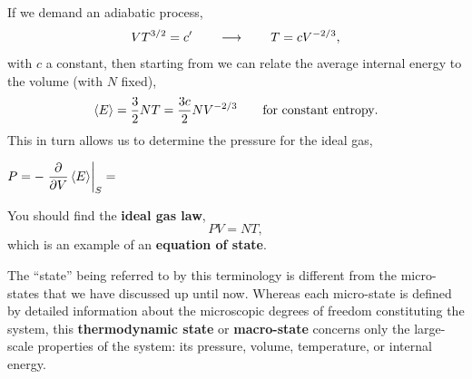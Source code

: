 If we demand an adiabatic process,
\begin{equation*}
  V T^{3/2} = c' \qquad \longrightarrow \qquad T = c V^{-2 / 3},
\end{equation*}
with $c$ a constant, then starting from  we can relate the average internal energy to the volume (with $N$ fixed),
\begin{equation*}
  \left\langle E \right\rangle = \frac{3}{2} NT = \frac{3c}{2} N V^{-2 / 3} \qquad \mbox{for constant entropy}.
\end{equation*}
This in turn allows us to determine the pressure for the ideal gas,
\begin{mdframed}
  $\displaystyle P = -\left. \frac{\partial }{\partial V} \left\langle E \right\rangle\right|_S = $ \\[100 pt]
\end{mdframed}

\begin{shaded}
  You should find the \textbf{ideal gas law},
  \begin{equation}
    \label{eq:ideal_gas_law}
    PV = NT,
  \end{equation}
  which is an example of an \textbf{equation of state}.
\end{shaded}

The ``state'' being referred to by this terminology is different from the micro-states that we have discussed up until now.
Whereas each micro-state is defined by detailed information about the microscopic degrees of freedom constituting the system, this \textbf{thermodynamic state} or \textbf{macro-state} concerns only the large-scale properties of the system: its pressure, volume, temperature, or internal energy.

